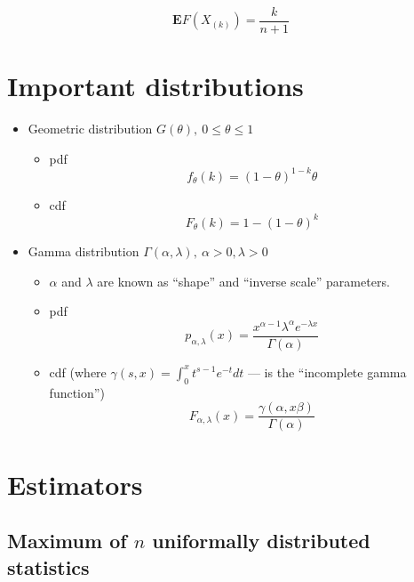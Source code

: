 \documentclass[12pt]{article}
\begin{document}
\begin{equation}\label{kth_order_expectation}
	\textbf{E}F(X_{(k)}) = \frac k{n+1}
\end{equation}


\section{Important distributions}
\begin{itemize}
	\item Geometric distribution $G(\theta),\ 0\leq\theta\leq 1$
	\begin{itemize}
		\item pdf
		\begin{equation}\label{geometric_pdf}
			f_\theta(k) = (1-\theta)^{1-k}\theta
		\end{equation}
		\item cdf
		\begin{equation}\label{geometric_cdf}
			F_\theta(k) = 1-(1-\theta)^k
		\end{equation}
	\end{itemize}
	\item Gamma distribution $\Gamma(\alpha, \lambda),\ \alpha >0, \lambda > 0$
	\begin{itemize}
		\item $\alpha$ and $\lambda$ are known as ``shape'' and ``inverse scale'' parameters.
		\item pdf
			\begin{equation}\label{gamma_pdf}
				p_{\alpha, \lambda} (x)= \frac{x^{\alpha - 1} \lambda^{\alpha}e^{-\lambda x}}{\Gamma(\alpha)}
			\end{equation}
		\item cdf (where $\gamma(s, x) = \int_0^x t^{s-1}e^{-t}dt$ --- is the ``incomplete gamma function'')
			\begin{equation}
				F_{\alpha,\lambda}(x) = \frac{\gamma(\alpha, x\beta)}{\Gamma(\alpha)}
			\end{equation}


	\end{itemize}
\end{itemize}


\section{Estimators}

\subsection{Maximum of $n$ uniformally distributed statistics}
\end{document}
